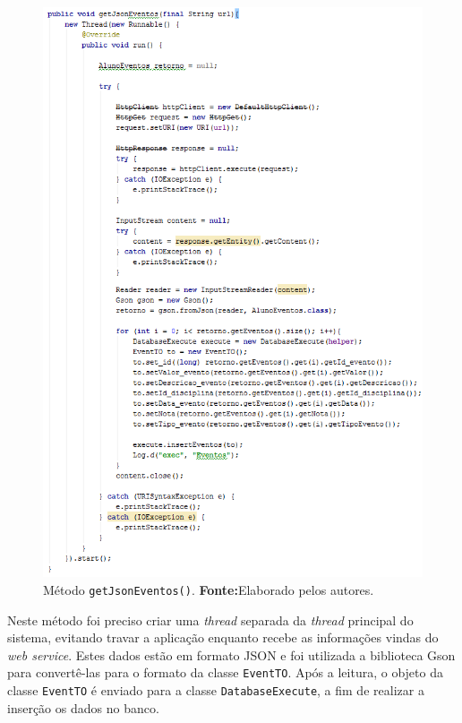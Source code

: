 	\begin{figure}[h!] 
		\centerline{\includegraphics[scale=0.7]{./imagens/2_q_metodologico/4_procedimentos_resultados/42_aplicativo/app5.png}}
		\caption[Método getJsonEventos()]{Método \texttt{getJsonEventos()}.
		\textbf{Fonte:}Elaborado pelos autores.}
		\label{fig:app5}
	\end{figure}
	
	\pagebreak
	
	\par Neste método foi preciso criar uma \textit{thread} separada da
\textit{thread} principal do sistema, evitando travar a aplicação enquanto
recebe as informações vindas do \textit{web service}. Estes dados estão em
formato JSON e foi utilizada a biblioteca Gson para convertê-las para o formato
da classe \texttt{EventTO}. Após a leitura, o objeto da classe \texttt{EventTO}
é enviado para a classe \texttt{DatabaseExecute}, a fim de realizar a inserção
os dados no banco.
	
